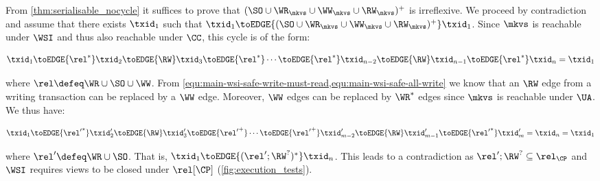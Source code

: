 \noindent From \cref{thm:serialisable_nocycle} it suffices to prove that $(\SO \cup \WR_{\mkvs} \cup \WW_{\mkvs} \cup \RW_{\mkvs})^{+}$ is irreflexive.
We proceed by contradiction and assume that there exists $\txid_1$ such that $\txid_1 \toEDGE{(\SO \cup \WR_{\mkvs} \cup \WW_{\mkvs} \cup \RW_{\mkvs})^{+}} \txid_1$. 
Since \( \mkvs \) is reachable under \( \WSI \) and thus also reachable under \( \CC \),
this cycle is of the form:

\spaceshrink{-3pt}
{\displaymathfont
\[
    \txid_1 \toEDGE{\rel^*} \txid_2 \toEDGE{\RW} \txid_3 \toEDGE{\rel^*} \cdots \toEDGE{\rel^*} \txid_{n-2} \toEDGE{\RW} \txid_{n-1} \toEDGE{\rel^*} \txid_n = \txid_1
\]
\normalsize}%
\spaceshrink{-7pt}
 
\noindent{}where \( \rel \defeq \WR \cup \SO \cup \WW \).
From \cref{equ:main-wsi-safe-write-must-read,equ:main-wsi-safe-all-write} we know that 
an \( \RW \) edge from a writing transaction can be replaced by a \( \WW \) edge.
Moreover, \( \WW \) edges can be replaced by \( \WR^* \) edges since \( \mkvs \) is reachable under \( \UA \).
We thus have:

\spaceshrink{-3pt}
{\displaymathfont
\[
    \txid_1 \toEDGE{{\rel'}^*} \txid'_2 \toEDGE{\RW} \txid'_3 \toEDGE{{\rel'}^+} \cdots \toEDGE{{\rel'}^+} \txid'_{m-2} \toEDGE{\RW} \txid'_{m-1} \toEDGE{{\rel'}^*} \txid'_m = \txid_n = \txid_1
\]
\normalsize}
\spaceshrink{-7pt}

%
\noindent where \( \rel' \defeq \WR \cup \SO \).
That is, \( \txid_1 \toEDGE{( \rel'; \RW^? )^* } \txid_n \).
This leads to a contradiction as \( \rel'; \RW^? \subseteq \rel_\CP \) and 
\( \WSI \) requires views to be closed under \( \rel[\CP] \) (\cref{fig:execution_tests}). 



